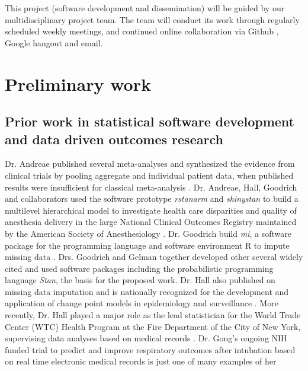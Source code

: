 \documentclass[11pt,notitlepage]{article}
\begin{document}
This project (software development and dissemination) will be guided by 
our multidisciplinary project team. The team will conduct its work through 
regularly scheduled weekly meetings, and continued online collaboration via 
Github \cite{Chacon2009ProGit}, Google hangout and email. 



\section*{Preliminary work}

\subsection*{Prior work in statistical software development and data driven outcomes research} Dr. Andreae published several meta-analyses and synthesized the evidence 
from clinical trials by pooling aggregate and individual patient data, when 
published results were insufficient for classical meta-analysis 
\cite{AndreaeJohnsonAbstract2013, Andreae2013, Andreae2015, Carter2015, Atchabahian2015}. Dr. Andreae, Hall, Goodrich and collaborators used the software 
prototype \textit{rstanarm} and \textit{shinystan} to build a multilevel 
hierarchical model to investigate health care disparities and quality of 
anesthesia delivery in the large National Clinical Outcomes Registry maintained 
by the American Society of Anesthesiology \cite{AndreaeWhite2015}. Dr. Goodrich 
build \textit{mi}, a software package for the programming language and 
software environment R to impute missing data \cite{miCRAN}. Drs. Goodrich 
and Gelman together developed other several widely cited and used software packages including the probabilistic programming language \textit{Stan}\cite{Stan_Software_2014}, 
the basis for the proposed work. Dr. Hall also published on missing data 
imputation \cite{Hall2009a, Wang_20029935, Wang_20029935} and is nationally 
recognized for the development and application of change point models in 
epidemiology and surveillance 
\cite{Hall2000, Hall2001, Hall2003bayesian, Hall2009, Hall2015}. 
More recently, Dr. Hall played a major role as the lead statistician 
for the World Trade Center (WTC) Health Program at the Fire Department 
of the City of New York, supervising data analyses based on medical 
records \cite{Aldrich2010, Hall2015, Zeig-Owens2011}.  
Dr. Gong's ongoing NIH funded trial to predict and improve 
respiratory outcomes after intubation based on real time 
electronic medical records is just one of many examples of her 
\end{document}
